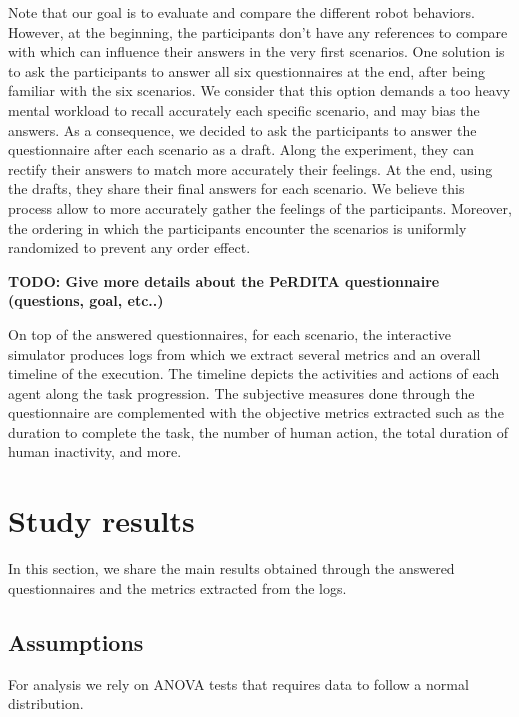 Note that our goal is to evaluate and compare the different robot behaviors. However, at the beginning, the participants don't have any references to compare with which can influence their answers in the very first scenarios. One solution is to ask the participants to answer all six questionnaires at the end, after being familiar with the six scenarios. We consider that this option demands a too heavy mental workload to recall accurately each specific scenario, and may bias the answers. As a consequence, we decided to ask the participants to answer the questionnaire after each scenario as a draft. Along the experiment, they can rectify their answers to match more accurately their feelings. At the end, using the drafts, they share their final answers for each scenario. We believe this process allow to more accurately gather the feelings of the participants. Moreover, the ordering in which the participants encounter the scenarios is uniformly randomized to prevent any order effect. 

\textbf{TODO: Give more details about the PeRDITA questionnaire (questions, goal, etc..)}

On top of the answered questionnaires, for each scenario, the interactive simulator produces logs from which we extract several metrics and an overall timeline of the execution. The timeline depicts the activities and actions of each agent along the task progression. The subjective measures done through the questionnaire are complemented with the objective metrics extracted such as the duration to complete the task, the number of human action, the total duration of human inactivity, and more. 



\section{Study results}


In this section, we share the main results obtained through the answered questionnaires and the metrics extracted from the logs.

\subsection{Assumptions}

For analysis we rely on ANOVA tests that requires data to follow a normal distribution. 

